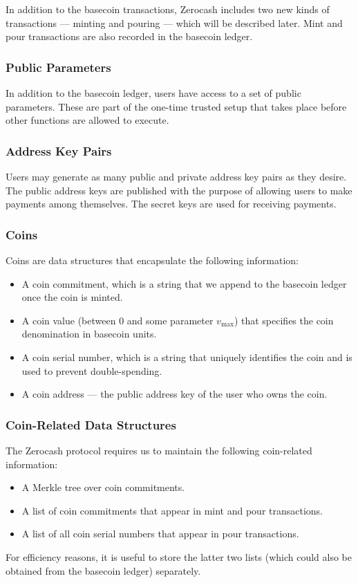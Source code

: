 \documentclass{article}
\begin{document}
In addition to the basecoin transactions, Zerocash includes two new kinds of transactions --- minting and pouring --- which will be described later. Mint and pour transactions are also recorded in the basecoin ledger.

\subsubsection{Public Parameters}
In addition to the basecoin ledger, users have access to a set of public parameters. These are part of the one-time trusted setup that takes place before other functions are allowed to execute.

\subsubsection{Address Key Pairs}
Users may generate as many public and private address key pairs as they desire. The public address keys are published with the purpose of allowing users to make payments among themselves. The secret keys are used for receiving payments.

\subsubsection{Coins}
Coins are data structures that encapsulate the following information:
\begin{itemize}
\item A coin commitment, which is a string that we append to the basecoin ledger once the coin is minted.
\item A coin value (between 0 and some parameter $v_{\text{max}}$) that specifies the coin denomination in basecoin units.
\item A coin serial number, which is a string that uniquely identifies the coin and is used to prevent double-spending.
\item A coin address --- the public address key of the user who owns the coin.
\end{itemize}

\subsubsection{Coin-Related Data Structures}
The Zerocash protocol requires us to maintain the following coin-related information:
\begin{itemize}
\item A Merkle tree over coin commitments.
\item A list of coin commitments that appear in mint and pour transactions.
\item A list of all coin serial numbers that appear in pour transactions.
\end{itemize}
For efficiency reasons, it is useful to store the latter two lists (which could also be obtained from the basecoin ledger) separately.
\end{document}
